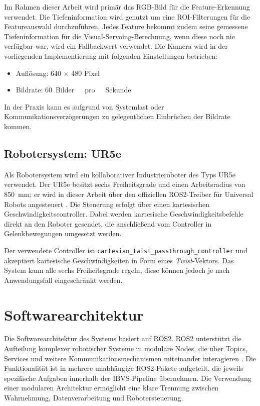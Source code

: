 Im Rahmen dieser Arbeit wird primär das RGB-Bild für die Feature-Erkennung verwendet. Die Tiefeninformation wird genutzt um eine \ac{ROI}-Filterungen für die Featureauswahl durchzuführen. Jedes Feature bekommt zudem seine gemessene Tiefeninformation für die Visual-Servoing-Berechnung, wenn diese noch nie verfügbar war, wird ein Fallbackwert verwendet. Die Kamera wird in der vorliegenden Implementierung mit folgenden Einstellungen betrieben:

\begin{itemize}
	\item Auflösung: 640 $\times$ 480 Pixel
	\item Bildrate: \SI{60}{Bilder\ pro\ Sekunde}
\end{itemize}

In der Praxis kann es aufgrund von Systemlast oder Kommunikationsverzögerungen zu gelegentlichen Einbrüchen der Bildrate kommen.

\subsection{Robotersystem: UR5e}
\label{subsec:ur5e}

Als Robotersystem wird ein kollaborativer Industrieroboter des Typs UR5e verwendet. Der UR5e besitzt sechs Freiheitsgrade und einen Arbeitsradius von \SI{850}{mm}; er wird in dieser Arbeit über den offiziellen \ac{ROS2}-Treiber für Universal Robots angesteuert \cite{ur5e_specs, ur_ros2_driver}. Die Steuerung erfolgt über einen kartesischen Geschwindigkeitscontroller. Dabei werden kartesische Geschwindigkeitsbefehle direkt an den Roboter gesendet, die anschließend vom Controller in Gelenkbewegungen umgesetzt werden.

Der verwendete Controller ist \texttt{cartesian\_twist\_passthrough\_controller} und akzeptiert kartesische Geschwindigkeiten in Form eines \textit{Twist}-Vektors. Das System kann alle sechs Freiheitsgrade regeln, diese können jedoch je nach Anwendungsfall eingeschränkt werden.

\newpage
\section{Softwarearchitektur}
\label{sec:softwarearchitektur}

Die Softwarearchitektur des Systems basiert auf \ac{ROS2}. \ac{ROS2} unterstützt die Aufteilung komplexer robotischer Systeme in modulare Nodes, die über Topics, Services und weitere Kommunikationsmechanismen miteinander interagieren \cite{ros2_nodes, ros2_topics}. Die Funktionalität ist in mehrere unabhängige \ac{ROS2}-Pakete aufgeteilt, die jeweils spezifische Aufgaben innerhalb der \ac{IBVS}-Pipeline übernehmen. Die Verwendung einer modularen Architektur ermöglicht eine klare Trennung zwischen Wahrnehmung, Datenverarbeitung und Robotersteuerung.

